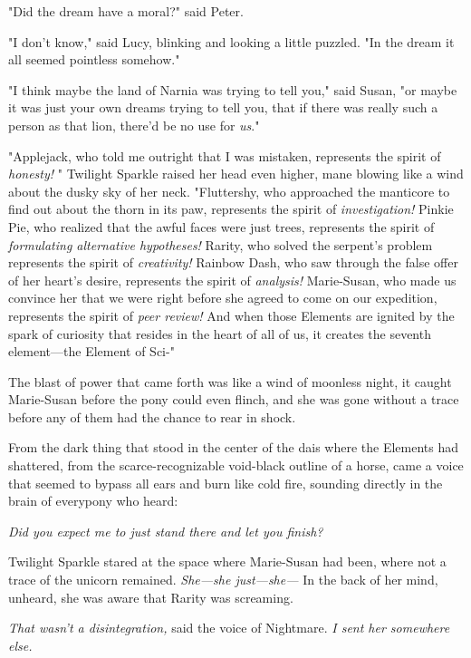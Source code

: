 "Did the dream have a moral?" said Peter.

"I don't know," said Lucy, blinking and looking a little puzzled. "In the dream
it all seemed pointless somehow."

"I think maybe the land of Narnia was trying to tell you," said Susan, "or
maybe it was just your own dreams trying to tell you, that if there was really
such a person as that lion, there'd be no use for \emph{us}."
\sbreak%

"Applejack, who told me outright that I was mistaken, represents the spirit
of{\el} \emph{honesty!} " Twilight Sparkle raised her head even higher, mane
blowing like a wind about the dusky sky of her neck. "Fluttershy, who
approached the manticore to find out about the thorn in its paw, represents the
spirit of{\el} \emph{investigation!} Pinkie Pie, who realized that the awful
faces were just trees, represents the spirit of{\el} \emph{formulating
alternative hypotheses!} Rarity, who solved the serpent's problem represents
the spirit of{\el} \emph{creativity!} Rainbow Dash, who saw through the
false offer of her heart's desire, represents the spirit of{\el}
\emph{analysis!} Marie-Susan, who made us convince her that we were right
before she agreed to come on our expedition, represents the spirit of{\el}
\emph{peer review!} And when those Elements are ignited by the spark of
curiosity that resides in the heart of all of us, it creates the seventh
element---the Element of Sci-"

The blast of power that came forth was like a wind of moonless night, it caught
Marie-Susan before the pony could even flinch, and she was gone without a trace
before any of them had the chance to rear in shock.

From the dark thing that stood in the center of the dais where the Elements had
shattered, from the scarce-recognizable void-black outline of a horse, came a
voice that seemed to bypass all ears and burn like cold fire, sounding directly
in the brain of everypony who heard:

\emph{Did you expect me to just stand there and let you finish?}

Twilight Sparkle stared at the space where Marie-Susan had been, where not a
trace of the unicorn remained. \emph{She---she just---she---} In the back of
her mind, unheard, she was aware that Rarity was screaming.

\emph{That wasn't a disintegration,} said the voice of Nightmare. \emph{I sent
her somewhere else.}

